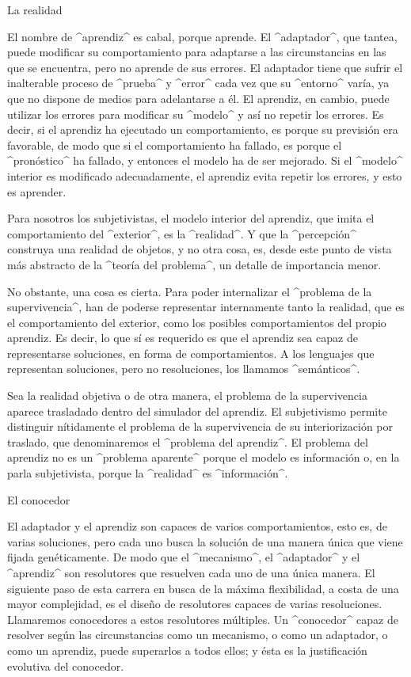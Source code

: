\Section La realidad

El nombre de ^aprendiz^ es cabal, porque aprende. El ^adaptador^, que
tantea, puede modificar su comportamiento para adaptarse a las
circunstancias en las que se encuentra, pero no aprende de sus errores.
El adaptador tiene que sufrir el inalterable proceso de ^prueba^ y
^error^ cada vez que su ^entorno^ varía, ya que no dispone de medios
para adelantarse a él. El aprendiz, en cambio, puede utilizar los
errores para modificar su ^modelo^ y así no repetir los errores. Es
decir, si el aprendiz ha ejecutado un comportamiento, es porque su
previsión era favorable, de modo que si el comportamiento ha fallado, es
porque el ^pronóstico^ ha fallado, y entonces el modelo ha de ser
mejorado. Si el ^modelo^ interior es modificado adecuadamente, el
aprendiz evita repetir los errores, y esto es aprender.

Para nosotros los subjetivistas, el modelo interior del aprendiz, que
imita el comportamiento del ^exterior^, es la ^realidad^. Y que la
^percepción^ construya una realidad de objetos, y no otra cosa, es,
desde este punto de vista más abstracto de la ^teoría del problema^, un
detalle de importancia menor.

No obstante, una cosa es cierta. Para poder internalizar el ^problema de
la supervivencia^, han de poderse representar internamente tanto la
realidad, que es el comportamiento del exterior, como los posibles
comportamientos del propio aprendiz. Es decir, lo que sí es requerido es
que el aprendiz sea capaz de representarse soluciones, en forma de
comportamientos. A los lenguajes que representan soluciones, pero no
resoluciones, los llamamos ^semánticos^.

Sea la realidad objetiva o de otra manera, el problema de la
supervivencia aparece trasladado dentro del simulador del aprendiz. El
subjetivismo permite distinguir nítidamente el problema de la
supervivencia de su interiorización por traslado, que denominaremos el
^problema del aprendiz^. El problema del aprendiz no es un ^problema
aparente^ porque el modelo es información o, en la parla subjetivista,
porque la ^realidad^ es ^información^.


\Section El conocedor

El adaptador y el aprendiz son capaces de varios comportamientos, esto
es, de varias soluciones, pero cada uno busca la solución de una manera
única que viene fijada genéticamente. De modo que el ^mecanismo^, el
^adaptador^ y el ^aprendiz^ son resolutores que resuelven cada uno de
una única manera. El siguiente paso de esta carrera en busca de la
máxima flexibilidad, a costa de una mayor complejidad, es el diseño de
resolutores capaces de varias resoluciones. Llamaremos conocedores a
estos resolutores múltiples. Un ^conocedor^ capaz de resolver según las
circunstancias como un mecanismo, o como un adaptador, o como un
aprendiz, puede superarlos a todos ellos; y ésta es la justificación
evolutiva del conocedor.

